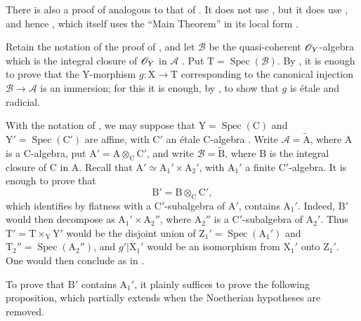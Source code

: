 \begin{remark}[18.12.14]
\label{IV.18.12.14}
There is also a proof of  analogous to that of . It does not use , but it does use , and hence , which itself uses the ``Main Theorem'' in its local form .

Retain the notation of the proof of , and let $\mathscr{B}$ be the quasi-coherent $\mathscr{O}_Y$-algebra which is the integral closure of $\mathscr{O}_Y$ in $\mathscr{A}$ . Put $\mathrm{T}=\operatorname{Spec}(\mathscr{B})$. By , it is enough to prove that the $\mathrm{Y}$-morphism $g:\mathrm{X}\to\mathrm{T}$ corresponding to the canonical injection $\mathscr{B}\to\mathscr{A}$ is an immersion; for this it is enough, by , to show that $g$ is \'etale and radicial.

With the notation of , we may suppose that $\mathrm{Y}=\operatorname{Spec}(\mathrm{C})$ and $\mathrm{Y}'=\operatorname{Spec}(\mathrm{C}')$ are affine, with $\mathrm{C}'$ an \'etale $\mathrm{C}$-algebra . Write $\mathscr{A}=\widetilde{\mathrm{A}}$, where $\mathrm{A}$ is a $\mathrm{C}$-algebra, put $\mathrm{A}'=\mathrm{A}\otimes_\mathrm{C}\mathrm{C}'$, and write $\mathscr{B}=\widetilde{\mathrm{B}}$, where $\mathrm{B}$ is the integral closure of $\mathrm{C}$ in $\mathrm{A}$. Recall that $\mathrm{A}'\simeq\mathrm{A}_1'\times\mathrm{A}_2'$, with $\mathrm{A}_1'$ a finite $\mathrm{C}'$-algebra. It is enough to prove that
\[
  \mathrm{B}'=\mathrm{B}\otimes_\mathrm{C}\mathrm{C}',
\]
which identifies by flatness with a $\mathrm{C}'$-subalgebra of $\mathrm{A}'$, contains $\mathrm{A}_1'$. Indeed, $\mathrm{B}'$ would then decompose as $\mathrm{A}_1'\times\mathrm{A}_2''$, where $\mathrm{A}_2''$ is a $\mathrm{C}'$-subalgebra of $\mathrm{A}_2'$. Thus $\mathrm{T}'=\mathrm{T}\times_\mathrm{Y}\mathrm{Y}'$ would be the disjoint union of $\mathrm{Z}_1'=\operatorname{Spec}(\mathrm{A}_1')$ and $\mathrm{T}_2''=\operatorname{Spec}(\mathrm{A}_2'')$, and $g'|\mathrm{X}_1'$ would be an isomorphism from $\mathrm{X}_1'$ onto $\mathrm{Z}_1'$. One would then conclude as in .

To prove that $\mathrm{B}'$ contains $\mathrm{A}_1'$, it plainly suffices to prove the following proposition, which partially extends  when the Noetherian hypotheses are removed.
\end{remark}

